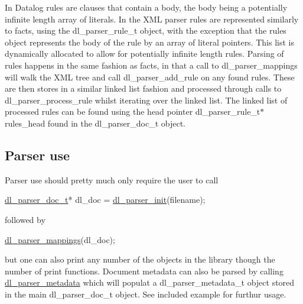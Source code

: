 In Datalog rules are clauses that contain a body, the body being a potentially infinite length array of literals. In the X\+ML parser rules are represented similarly to facts, using the dl\+\_\+parser\+\_\+rule\+\_\+t object, with the exception that the rules object represents the body of the rule by an array of literal pointers. This list is dynamically allocated to allow for potentially infinite length rules. Parsing of rules happens in the same fashion as facts, in that a call to dl\+\_\+parser\+\_\+mappings will walk the X\+ML tree and call dl\+\_\+parser\+\_\+add\+\_\+rule on any found rules. These are then stores in a similar linked list fashion and processed through calls to dl\+\_\+parser\+\_\+process\+\_\+rule whilst iterating over the linked list. The linked list of processed rules can be found using the head pointer dl\+\_\+parser\+\_\+rule\+\_\+t$\ast$ rules\+\_\+head found in the dl\+\_\+parser\+\_\+doc\+\_\+t object.

\subsection*{Parser use}

Parser use should pretty much only require the user to call


\begin{DoxyCode}
\hyperlink{structdl__parser__doc}{dl\_parser\_doc\_t}* dl\_doc = \hyperlink{datalog__parser_8c_a60bfcc264ca417a3c86c24d83775126a}{dl\_parser\_init}(filename);
\end{DoxyCode}
 followed by 
\begin{DoxyCode}
\hyperlink{datalog__parser_8c_a83e01ba37291311f7b45d9eaa89bfd77}{dl\_parser\_mappings}(dl\_doc);
\end{DoxyCode}


but one can also print any number of the objects in the library though the number of print functions. Document metadata can also be parsed by calling \hyperlink{structdl__parser__metadata}{dl\+\_\+parser\+\_\+metadata} which will populat a dl\+\_\+parser\+\_\+metadata\+\_\+t object stored in the main dl\+\_\+parser\+\_\+doc\+\_\+t object. See included example for furthur usage. 